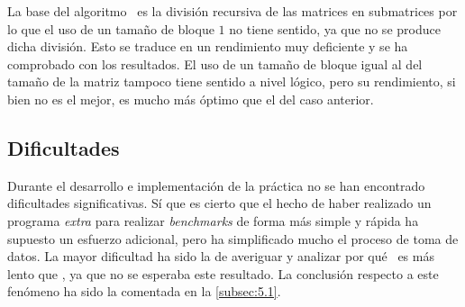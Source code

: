 La base del algoritmo \zorder\ es la división recursiva de las matrices en submatrices
por lo que el uso de un tamaño de bloque \(1\) no tiene sentido, ya que no se produce dicha división. Esto se traduce en un rendimiento muy deficiente y se ha comprobado con los resultados.
El uso de un tamaño de bloque igual al del tamaño de la matriz tampoco tiene sentido a nivel lógico, pero su rendimiento, si bien no es el mejor, es mucho más óptimo 
que el del caso anterior.  

\subsection{Dificultades}
Durante el desarrollo e implementación de la práctica no se han encontrado dificultades significativas. Sí que es cierto que el hecho de haber realizado 
un programa \textit{extra} para realizar \textit{benchmarks} de forma más simple y rápida ha supuesto un esfuerzo adicional, pero ha simplificado mucho el proceso 
de toma de datos. La mayor dificultad ha sido la de averiguar y analizar por qué \rowmajor\ es más lento que \colmajor, ya que no se esperaba este resultado.
La conclusión respecto a este fenómeno ha sido la comentada en la \autoref{subsec:5.1}.